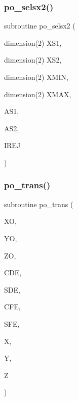\mbox{\label{sophia_8f_a83ddf78a90c35295d600702e51711056}} 
\subsubsection{\texorpdfstring{po\+\_\+selsx2()}{po\_selsx2()}}
{\footnotesize\ttfamily subroutine po\+\_\+selsx2 (\begin{DoxyParamCaption}\item[{dimension(2)}]{X\+S1,  }\item[{dimension(2)}]{X\+S2,  }\item[{dimension(2)}]{X\+M\+IN,  }\item[{dimension(2)}]{X\+M\+AX,  }\item[{}]{A\+S1,  }\item[{}]{A\+S2,  }\item[{}]{I\+R\+EJ }\end{DoxyParamCaption})}

\mbox{\label{sophia_8f_a90b3d826e619542e912c7540e0122f44}} 
\subsubsection{\texorpdfstring{po\+\_\+trans()}{po\_trans()}}
{\footnotesize\ttfamily subroutine po\+\_\+trans (\begin{DoxyParamCaption}\item[{}]{XO,  }\item[{}]{YO,  }\item[{}]{ZO,  }\item[{}]{C\+DE,  }\item[{}]{S\+DE,  }\item[{}]{C\+FE,  }\item[{}]{S\+FE,  }\item[{}]{X,  }\item[{}]{Y,  }\item[{}]{Z }\end{DoxyParamCaption})}

\mbox{\label{sophia_8f_ad9860632b53c4102f75afb65ab08ce14}} 
